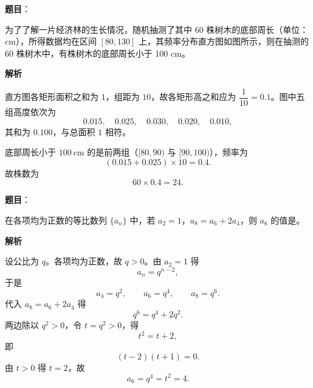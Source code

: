\begin{answer}

\textbf{题目}：

为了了解一片经济林的生长情况，随机抽测了其中 60 株树木的底部周长（单位：cm），所得数据均在区间 $[80,130]$ 上，其频率分布直方图如图所示，则在抽测的 60 株树木中，有\gkblank{}株树木的底部周长小于 100 cm。
\nopagebreak[4]
\begin{center}\end{center}
\nopagebreak[4]
\textbf{解析}

直方图各矩形面积之和为 $1$，组距为 $10$，故各矩形高之和应为 $\dfrac1{10}=0.1$。图中五组高度依次为
\nopagebreak[4]
\[0.015,\quad 0.025,\quad 0.030,\quad 0.020,\quad 0.010,\]
其和为 $0.100$，与总面积 $1$ 相符。

底部周长小于 $100\ \mathrm{cm}$ 的是前两组（$[80,90)$ 与 $[90,100)$），频率为
\nopagebreak[4]
\[(0.015+0.025)\times10=0.4.\]
故株数为
\nopagebreak[4]
\[60\times0.4=24.\]


\end{answer}
\begin{answer}

\textbf{题目}：

在各项均为正数的等比数列 $\{a_n\}$ 中，若 $a_2=1$，$a_8=a_6+2a_4$，则 $a_6$ 的值是\gkblank{}。

\textbf{解析}

设公比为 $q$。各项均为正数，故 $q>0$。由 $a_2=1$ 得
\nopagebreak[4]
\[a_n=q^{n-2},\]
于是
\nopagebreak[4]
\[a_4=q^2,\qquad a_6=q^4,\qquad a_8=q^6.\]
代入 $a_8=a_6+2a_4$ 得
\nopagebreak[4]
\[q^6=q^4+2q^2.\]
两边除以 $q^2>0$，令 $t=q^2>0$，得
\nopagebreak[4]
\[t^2=t+2,\]
即
\nopagebreak[4]
\[(t-2)(t+1)=0.\]
由 $t>0$ 得 $t=2$，故
\nopagebreak[4]
\[a_6=q^4=t^2=4.\]


\end{answer}
